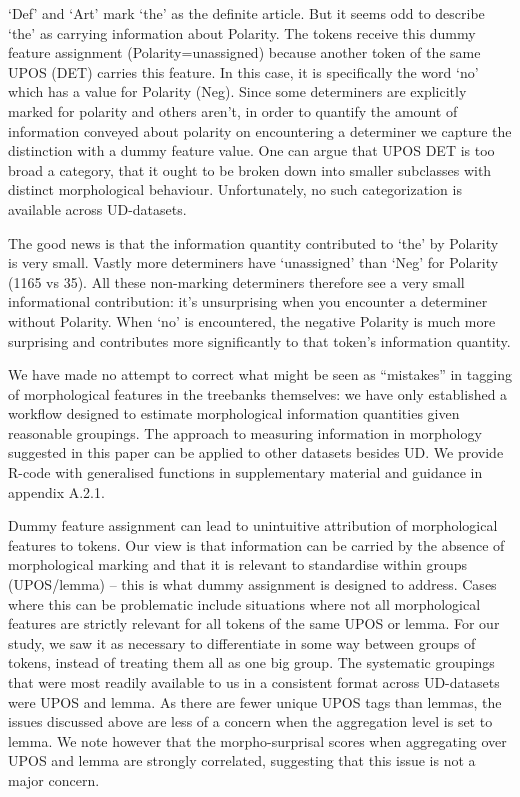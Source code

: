\documentclass[USenglish]{article}
\begin{document}
`Def' and `Art' mark `the' as the definite article.
But it seems odd to describe `the' as carrying information about Polarity.
The tokens receive this dummy feature assignment (Polarity=unassigned) because another token of the same UPOS (DET) carries this feature. 
In this case, it is specifically the word `no' which has a value for Polarity (Neg).
Since some determiners are explicitly marked for polarity and others aren't, in order to quantify the amount of information conveyed about polarity on encountering a determiner we capture the distinction with a dummy feature value.
One can argue that UPOS DET is too broad a category, that it ought to be broken down into smaller subclasses with distinct morphological behaviour. 
Unfortunately, no such categorization is available across UD-datasets. 

The good news is that the information quantity contributed to `the' by Polarity is very small.
Vastly more determiners have `unassigned' than `Neg' for Polarity (1165 vs 35).
All these non-marking determiners therefore see a very small informational contribution: it's unsurprising when you encounter a determiner without Polarity.
When `no' is encountered, the negative Polarity is much more surprising and contributes more significantly to that token's information quantity.

We have made no attempt to correct what might be seen as ``mistakes'' in tagging of morphological features in the treebanks themselves: we have only established a workflow designed to estimate morphological information quantities given reasonable groupings.
The approach to measuring information in morphology suggested in this paper can be applied to other datasets besides UD. 
We provide R-code with generalised functions in supplementary material and guidance in appendix A.2.1.

Dummy feature assignment can lead to unintuitive attribution of morphological features to tokens.
Our view is that information can be carried by the absence of morphological marking and that it is relevant to standardise within groups (UPOS/lemma) -- this is what dummy assignment is designed to address.
Cases where this can be problematic include situations where not all morphological features are strictly relevant for all tokens of the same UPOS or lemma.
For our study, we saw it as necessary to differentiate in some way between groups of tokens, instead of treating them all as one big group. 
The systematic groupings that were most readily available to us in a consistent format across UD-datasets were UPOS and lemma.
As there are fewer unique UPOS tags than lemmas, the issues discussed above are less of a concern when the aggregation level is set to lemma.
We note however that the morpho-surprisal scores when aggregating over UPOS and lemma are strongly correlated, suggesting that this issue is not a major concern.  
\end{document}

